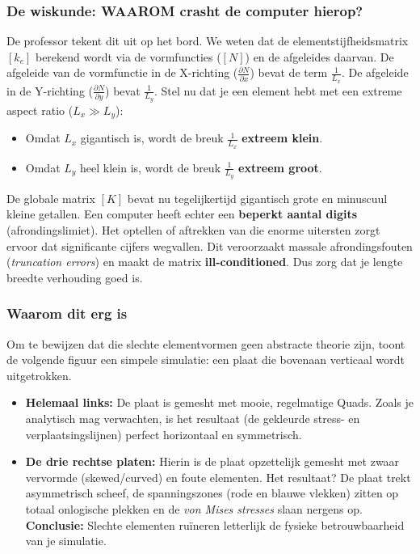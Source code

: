 \documentclass[a4paper,11pt,twoside]{report}
\begin{document}
\subsubsection{De wiskunde: WAAROM crasht de computer hierop?}
De professor tekent dit uit op het bord. We weten dat de elementstijfheidsmatrix $[k_e]$ berekend
wordt via de vormfuncties ($[N]$) en de afgeleides daarvan.
\newline
\newline
De afgeleide van de vormfunctie in de X-richting ($\frac{\partial N}{\partial x}$) bevat de term
$\frac{1}{L_x}$. De afgeleide in de Y-richting ($\frac{\partial N}{\partial y}$) bevat
$\frac{1}{L_y}$.
\newline
\newline
Stel nu dat je een element hebt met een extreme aspect ratio ($L_x \gg L_y$):
\begin{itemize}
    \item Omdat $L_x$ gigantisch is, wordt de breuk $\frac{1}{L_x}$ \textbf{extreem klein}.
    \item Omdat $L_y$ heel klein is, wordt de breuk $\frac{1}{L_y}$ \textbf{extreem groot}.
\end{itemize}
De globale matrix $[K]$ bevat nu tegelijkertijd gigantisch grote en minuscuul kleine getallen. Een
computer heeft echter een \textbf{beperkt aantal digits} (afrondingslimiet). Het optellen of
aftrekken van die enorme uitersten zorgt ervoor dat significante cijfers wegvallen. Dit veroorzaakt
massale afrondingsfouten (\textit{truncation errors}) en maakt de matrix \textbf{ill-conditioned}.
\newline
\newline
Dus zorg dat je lengte breedte verhouding goed is.
\subsubsection{Waarom dit erg is}
Om te bewijzen dat die slechte elementvormen geen abstracte theorie zijn, toont de volgende figuur
een simpele simulatie: een plaat die bovenaan verticaal wordt uitgetrokken.
\begin{itemize}
    \item \textbf{Helemaal links:} De plaat is gemesht met mooie, regelmatige Quads. Zoals je
          analytisch mag verwachten, is het resultaat (de gekleurde stress- en verplaatsingslijnen)
          perfect horizontaal en symmetrisch.
    \item \textbf{De drie rechtse platen:} Hierin is de plaat opzettelijk gemesht met zwaar
          vervormde (skewed/curved) en foute elementen. Het resultaat? De plaat trekt asymmetrisch scheef,
          de spanningszones (rode en blauwe vlekken) zitten op totaal onlogische plekken en de \textit{von
              Mises stresses} slaan nergens op. \textbf{Conclusie:} Slechte elementen ruïneren letterlijk de
          fysieke betrouwbaarheid van je simulatie.
\end{itemize}
\end{document}
